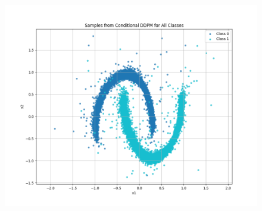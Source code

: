 \documentclass[a4paper,12pt]{article}
\begin{document}
\begin{figure}[H]
\begin{minipage}{0.3\textwidth}
  \end{minipage}
  \begin{minipage}{0.3\textwidth}
      \centering
      \includegraphics[width=\linewidth]{"images/Samples - CFG for cond_ddpm_2_50_0.0001_0.02_moons_0.2_sigmoid.png"}
  \end{minipage}

  \vspace{0.5cm}


\end{figure}
\end{document}
